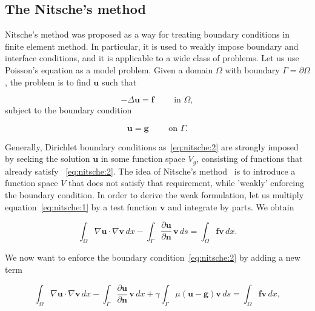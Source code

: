 \documentclass[11pt,a4paper,titlepage]{report}
\begin{document}
\subsection{The Nitsche's method}
Nitsche's method was proposed as a way for treating boundary conditions in finite element method. In particular, it is used to weakly impose boundary and interface conditions, and it is applicable to a wide class of problems. Let us use Poisson's equation as a model problem. Given a domain $\Omega$ with boundary $\Gamma = \partial \Omega$, the problem is to find $\mathbf{u}$ such that

\begin{equation}
- \Delta \mathbf{u} = \mathbf{f} \qquad \text{ in } \Omega,
\label{eq:nitsche:1}
\end{equation}
subject to the boundary condition

\begin{equation}
\mathbf{u} = \mathbf{g} \qquad \text{ on } \Gamma.
\label{eq:nitsche:2}
\end{equation}

Generally, Dirichlet boundary conditions as~\eqref{eq:nitsche:2} are strongly imposed by seeking the solution $\mathbf{u}$ in some function space $V_g$, consisting of functions that already satisfy ~\eqref{eq:nitsche:2}. The idea of Nitsche's method~\cite{Nitsche1977} is to introduce a function space $V$ that does not satisfy that requirement, while 'weakly' enforcing the boundary condition. In order to derive the weak formulation, let us multiply equation~\eqref{eq:nitsche:1} by a test function $\mathbf{v}$ and integrate by parts. We obtain 

\begin{equation}
\label{eq:nitsche:3}
\int_{\Omega} \nabla \mathbf{u} \cdot \nabla \mathbf{v} \, dx
- \int_{\Gamma} \frac{\partial \mathbf{u}}{\partial \mathbf{n}} \, \mathbf{v} \, ds
= \int_{\Omega} \mathbf{f} \mathbf{v} \, dx. 
\end{equation}

We now want to enforce the boundary condition~\eqref{eq:nitsche:2} by adding a new term 

\begin{equation}
\int_{\Omega} \nabla \mathbf{u} \cdot \nabla \mathbf{v} \, dx
- \int_{\Gamma} \frac{\partial \mathbf{u}}{\partial \mathbf{n}} \, \mathbf{v} \, dx 
+ \gamma \int_{\Gamma} \mu (\mathbf{u} - \mathbf{g}) \mathbf{v} \, ds
= \int_{\Omega} \mathbf{f} \mathbf{v} \, dx,
\end{equation}
\end{document}
